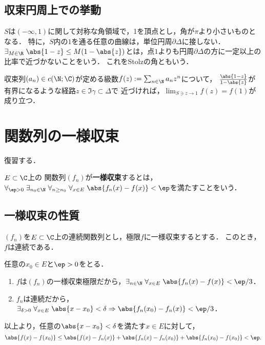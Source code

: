 \documentclass[uplatex, dvipdfmx]{jsreport}
\begin{document}
\subsection{収束円周上での挙動}

\begin{tcolorbox}[colframe=ForestGreen, colback=ForestGreen!10!white,breakable,colbacktitle=ForestGreen!40!white,coltitle=black,fonttitle=\bfseries\sffamily,
title=]
    $S$は$(-\infty,1)$に関して対称な角領域で，1を頂点とし，角が$\pi$より小さいものとなる．
    特に，$S$内の$1$を通る任意の曲線は，単位円周$\partial\Delta$に接しない．
    $\exists_{M\in\R}\;\abs{1-z}\le M(1-\abs{z})$とは，点$1$よりも円周$\partial\Delta$の方に一定以上の比率で近づかないことをいう．
    これをStolzの角ともいう．
\end{tcolorbox}

\begin{theorem}[Abel 2]
    収束列$(a_n)\in c(\N;\C)$が定める級数$f(z):=\sum_{n\in\N}a_nz^n$について，
    $\frac{\abs{1-z}}{1-\abs{z}}$が有界になるような経路$z\in\Im\gamma\subset\Delta$で
    近づければ，$\lim_{S\ni z\to1}f(z)=f(1)$が成り立つ．
\end{theorem}

\section{関数列の一様収束}

\begin{tcolorbox}[colframe=ForestGreen, colback=ForestGreen!10!white,breakable,colbacktitle=ForestGreen!40!white,coltitle=black,fonttitle=\bfseries\sffamily,
title=]
    復習する．
\end{tcolorbox}

\begin{definition}
    $E\subset\C$上の
    関数列$(f_n)$が\textbf{一様収束}するとは，$\forall_{\ep>0}\;\exists_{n_0\in\N}\;\forall_{n\ge n_0}\;\forall_{x\in E}\;\abs{f_n(x)-f(x)}<\ep$を満たすことをいう．
\end{definition}

\subsection{一様収束の性質}

\begin{theorem}[一様収束は連続性を保つ]
    $(f_n)$を$E\subset\C$上の連続関数列とし，極限$f$に一様収束するとする．
    このとき，$f$は連続である．
\end{theorem}
\begin{Proof}
    任意の$x_0\in E$と$\ep>0$をとる．
    \begin{enumerate}
        \item $f$は$(f_n)$の一様収束極限だから，$\exists_{n\in\N}\;\forall_{x\in E}\;\abs{f_n(x)-f(x)}<\ep/3$．
        \item $f_n$は連続だから，$\exists_{\delta>0}\;\forall_{x\in E}\;\abs{x-x_0}<\delta\Rightarrow\abs{f_n(x_0)-f_n(x)}<\ep/3$．
    \end{enumerate}
    以上より，任意の$\abs{x-x_0}<\delta$を満たす$x\in E$に対して，
    \[\abs{f(x)-f(x_0)}\le\abs{f(x)-f_n(x)}+\abs{f_n(x)-f_n(x_0)}+\abs{f_n(x_0)-f(x_0)}<\ep.\]
\end{Proof}
\end{document}
